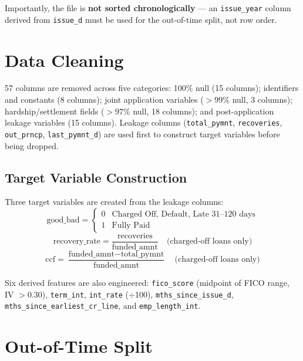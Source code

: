 \documentclass[12pt,a4paper]{report}
\begin{document}
Importantly, the file is \textbf{not sorted chronologically} --- an \texttt{issue\_year} column derived from \texttt{issue\_d} must be used for the out-of-time split, not row order.

\section{Data Cleaning}

57 columns are removed across five categories: 100\% null (15 columns); identifiers and constants (8 columns); joint application variables ($>99\%$ null, 3 columns); hardship/settlement fields ($>97\%$ null, 18 columns); and post-application leakage variables (15 columns). Leakage columns (\texttt{total\_pymnt}, \texttt{recoveries}, \texttt{out\_prncp}, \texttt{last\_pymnt\_d}) are used first to construct target variables before being dropped.

\subsection{Target Variable Construction}

Three target variables are created from the leakage columns:
\begin{equation}
  \text{good\_bad} = \begin{cases} 0 & \text{Charged Off, Default, Late 31--120 days} \\ 1 & \text{Fully Paid} \end{cases}
\end{equation}
\begin{equation}
  \text{recovery\_rate} = \frac{\text{recoveries}}{\text{funded\_amnt}} \quad \text{(charged-off loans only)}
\end{equation}
\begin{equation}
  \text{ccf} = \frac{\text{funded\_amnt} - \text{total\_pymnt}}{\text{funded\_amnt}} \quad \text{(charged-off loans only)}
\end{equation}

Six derived features are also engineered: \texttt{fico\_score} (midpoint of FICO range, IV $> 0.30$), \texttt{term\_int}, \texttt{int\_rate} ($\div$100), \texttt{mths\_since\_issue\_d}, \texttt{mths\_since\_earliest\_cr\_line}, and \texttt{emp\_length\_int}.

\section{Out-of-Time Split}
\end{document}
